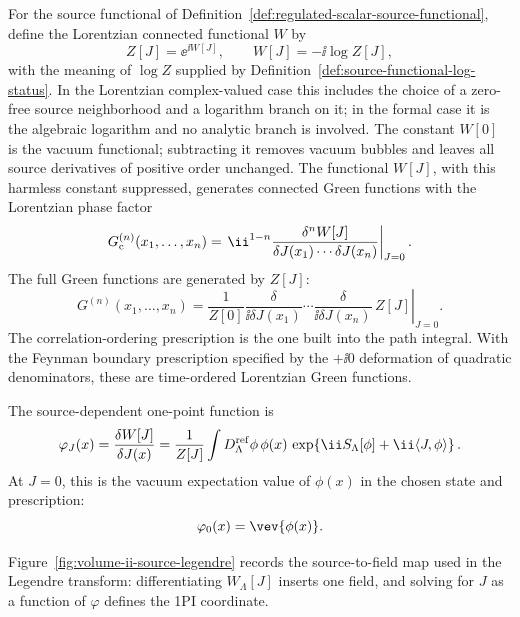 \begin{definition}
\label{def:connected-functional-source-dependent-field}
For the source functional of
Definition~\ref{def:regulated-scalar-source-functional}, define the
Lorentzian connected functional \(W\) by
\[
  Z[J]=\ee^{\ii W[J]},
  \qquad
  W[J]=-\ii\log Z[J],
\]
with the meaning of \(\log Z\) supplied by
Definition~\ref{def:source-functional-log-status}.  In the Lorentzian
complex-valued case this includes the choice of a zero-free source
neighborhood and a logarithm branch on it; in the formal case it is the
algebraic logarithm and no analytic branch is involved.  The constant \(W[0]\)
is the vacuum functional; subtracting it removes vacuum bubbles and leaves all
source derivatives of positive order unchanged.  The functional \(W[J]\), with
this harmless constant suppressed, generates connected Green functions with
the Lorentzian phase factor
\[
  G^{(n)}_{\rm c}(x_1,\ldots,x_n)
  =
  \left.
  \ii^{1-n}
  \frac{\delta^n W[J]}
       {\delta J(x_1)\cdots \delta J(x_n)}
  \right|_{J=0}.
\]
The full Green functions are generated by \(Z[J]\):
\[
  G^{(n)}(x_1,\ldots,x_n)
  =
  \left.
  \frac1{Z[0]}
  \frac{\delta}{\ii\delta J(x_1)}\cdots
  \frac{\delta}{\ii\delta J(x_n)}\,Z[J]
  \right|_{J=0}.
\]
The correlation-ordering prescription is the one built into the path integral.
With the Feynman boundary prescription specified by the \(+\ii0\) deformation
of quadratic denominators, these are time-ordered Lorentzian Green functions.

The source-dependent one-point function is
\[
  \varphi_J(x)
  =
  \frac{\delta W[J]}{\delta J(x)}
  =
  \frac1{Z[J]}
  \int D_\Lambda^{\rm ref}\phi\,
  \phi(x)\,
  \exp\!\left\{
    \ii S_\Lambda[\phi]+\ii\langle J,\phi\rangle
  \right\}.
\]
At \(J=0\), this is the vacuum expectation value of \(\phi(x)\) in the chosen
state and prescription:
\[
  \varphi_0(x)=\vev{\phi(x)} .
\]
\end{definition}

Figure~\ref{fig:volume-ii-source-legendre} records the source-to-field map used
in the Legendre transform: differentiating \(W_\Lambda[J]\) inserts one field,
and solving for \(J\) as a function of \(\varphi\) defines the 1PI coordinate.

